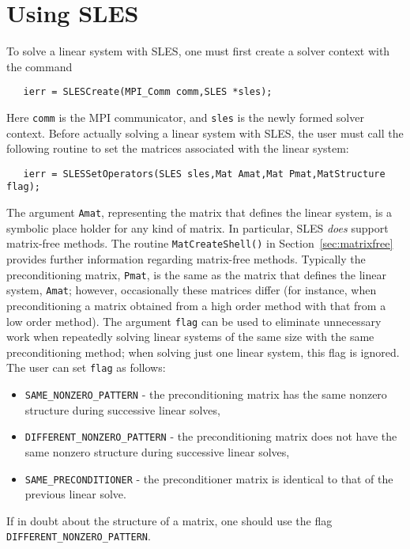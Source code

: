 \section{Using SLES} 
\label{sec:usingsles}

To solve a linear system with SLES, one must first create a solver context 
with the command 
\begin{verbatim}
   ierr = SLESCreate(MPI_Comm comm,SLES *sles); 
\end{verbatim}
Here {\tt comm} is the MPI communicator, and {\tt sles} is the newly
formed solver context.
Before actually solving a linear system with SLES, the user must call 
the following routine to set the matrices associated with the linear
system: 
\begin{verbatim}
   ierr = SLESSetOperators(SLES sles,Mat Amat,Mat Pmat,MatStructure flag);
\end{verbatim}
The argument {\tt Amat}, representing the matrix that defines the
linear system, is a symbolic place holder for any kind of matrix.  
In particular, SLES {\em does} support matrix-free methods. 
The routine {\tt MatCreateShell()} 
in Section~\ref{sec:matrixfree} provides further information regarding
matrix-free methods. 
Typically the preconditioning matrix, {\tt Pmat}, is the same as
the matrix that defines the linear system, {\tt Amat}; however,
occasionally these matrices differ (for instance, 
when preconditioning a matrix obtained from a high order method with 
that from a low order method).
The argument {\tt flag} can be used to eliminate unnecessary work when
repeatedly solving linear systems of the same size with the same 
preconditioning method; when solving just one linear system, this flag is
ignored.  The user can set {\tt flag} as follows:
\begin{itemize}
\item {\tt SAME\_NONZERO\_PATTERN} - the preconditioning matrix has the
    same  nonzero structure during successive
    linear solves,
\item {\tt DIFFERENT\_NONZERO\_PATTERN} - the preconditioning matrix does
     not have the same nonzero structure during successive linear solves,
\item {\tt SAME\_PRECONDITIONER} - the preconditioner matrix is identical
   to that of the previous linear solve. 
\end{itemize}
If in doubt about the structure of a matrix, one should use
the flag {\tt DIFFERENT\_NONZERO\_PATTERN}.
 
